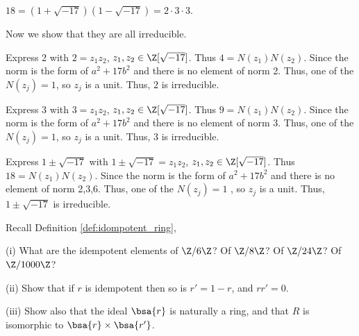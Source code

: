 \begin{solution}[\bf Solution.]
$18 = (1+\sqrt{-17})(1-\sqrt{-17}) = 2 \cdot 3 \cdot 3$.

Now we show that they are all irreducible.

Express 2 with $2= z_1z_2$, $z_1,z_2\in \Z[\sqrt{-17}]$. Thus $4 = N(z_1)N(z_2)$. Since the norm is the form of $a^2 + 17b^2$ and there is no element of norm 2. Thus, one of the $N(z_j) = 1$, so $z_j$ is a unit. Thus, $2$ is irreducible.

Express 3 with $3= z_1z_2$, $z_1,z_2\in \Z[\sqrt{-17}]$. Thus $9 = N(z_1)N(z_2)$. Since the norm is the form of $a^2 + 17b^2$ and there is no element of norm 3. Thus, one of the $N(z_j) = 1$, so $z_j$ is a unit. Thus, $3$ is irreducible.

Express $1 \pm \sqrt{-17}$ with $1 \pm \sqrt{-17} = z_1z_2$, $z_1,z_2\in \Z[\sqrt{-17}]$. Thus $18 = N(z_1)N(z_2)$. Since the norm is the form of $a^2 + 17b^2$ and there is no element of norm 2,3,6. Thus, one of the $N(z_j) = 1$ , so $z_j$ is a unit. Thus, $1 \pm \sqrt{-17}$ is irreducible.
\end{solution}


\begin{problem}\label{que:idempotent}
Recall Definition \ref{def:idompotent_ring},
\ben
\item [(i)] What are the idempotent elements of $\Z/6\Z$? Of $\Z/8\Z$? Of $\Z/24\Z$? Of $\Z/1000\Z$?
\item [(ii)] Show that if $r$ is idempotent then so is $r' = 1 - r$, and $rr' = 0$.
\item [(iii)] Show also that the ideal $\bsa{r}$ is naturally a ring, and that $R$ is isomorphic to $\bsa{r} \times \bsa{r'}$.
\een
\end{problem}

